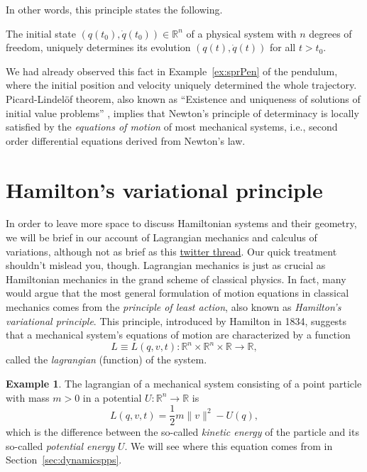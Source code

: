 \documentclass[english,fontsize=11pt,paper=b5]{scrbook}
\theoremstyle{definition}
\newtheorem{example}{Example}[chapter]
\newcommand{\emphidx}[1]{\index{#1}\emph{#1}}
\begin{document}
  In other words, this principle states the following.

  \begin{tcolorbox}[title=Newton's principle of determinacy]
    The initial state $\left(q(t_0), \dot q(t_0)\right) \in \mathbb{R}^n$ of a physical system with $n$ degrees of freedom, uniquely determines its evolution $\left(q(t),\dot q(t)\right)$ for all $t > t_0$.
  \end{tcolorbox}

  We had already observed this fact in Example~\ref{ex:sprPen} of the pendulum, where the initial position and velocity uniquely determined the whole trajectory.
  Picard-Lindel\"of theorem, also known as ``Existence and uniqueness of solutions of initial value problems'' \cite[Theorem 3.17]{book:knauf}, implies that Newton's principle of determinacy is locally satisfied by the \emphidx{equations of motion} of most mechanical systems, i.e., second order differential equations derived from Newton's law.

  \section{Hamilton's variational principle}\label{sec:varpri}

  In order to leave more space to discuss Hamiltonian systems and their geometry, we will be brief in our account of Lagrangian mechanics and calculus of variations, although not as brief as this \href{https://web.archive.org/web/20220404153248/https://twitter.com/j\_bertolotti/status/1397159397596581889}{twitter thread}.
  Our quick treatment shouldn't mislead you, though. Lagrangian mechanics is just as crucial as Hamiltonian mechanics in the grand scheme of classical physics.
  In fact, many would argue that the most general formulation of motion equations in classical mechanics comes from the \emph{principle of least action}, also known as \emph{Hamilton's variational principle}.
This principle, introduced by Hamilton in 1834, suggests that a mechanical system's equations of motion are characterized by a function
  \begin{equation}
    L \equiv L(q, v, t) : \mathbb{R}^n \times \mathbb{R}^n \times \mathbb{R} \to \mathbb{R},
  \end{equation}
  called the \emphidx{lagrangian} (function) of the system.

  \begin{example}
    The lagrangian of a mechanical system consisting of a point particle with mass $m > 0$ in a potential $U : \mathbb{R}^n \to \mathbb{R}$ is
    \begin{equation}
      L(q, v, t) = \frac12 m \|v\|^2 - U(q),
    \end{equation}
    which is the difference between the so-called \emph{kinetic energy} of the particle and its so-called \emph{potential energy} $U$.
    We will see where this equation comes from in Section~\ref{sec:dynamicspps}.
  \end{example}
\end{document}
